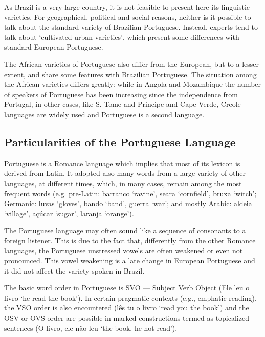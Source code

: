 \begin{multicols}{2}
As Brazil is a very large country, it is not feasible to present here its linguistic varieties. For geographical, political and social reasons, neither is it possible to talk about the standard variety of Brazilian Portuguese. Instead, experts tend to talk about ‘cultivated urban varieties’, which present some differences with standard European Portuguese. 

The African varieties of Portuguese also differ from the European, but to a lesser extent, and share some features with Brazilian Portuguese. The situation among the African varieties differs greatly: while in Angola and Mozambique the number of speakers of Portuguese has been increasing since the independence from Portugal, in other cases, like S. Tome and Principe and Cape Verde, Creole languages are widely used and Portuguese is a second language.

\subsection{Particularities of the Portuguese Language}

 Portuguese is a Romance language\cite{cardeira} which implies that most of its lexicon is derived from Latin. It adopted also many words from a large variety of other languages, at different times, which, in many cases, remain among the most frequent words (e.g. pre-Latin: barranco ‘ravine’, seara ‘cornfield’, bruxa ‘witch’; Germanic: luvas ‘gloves’, bando ‘band’, guerra ‘war’; and mostly Arabic: aldeia ‘village’, açúcar ‘sugar’, laranja ‘orange’).


The Portuguese language may often sound like a sequence of consonants to a foreign listener. This is due to the fact that, differently from the other Romance languages, the Portuguese unstressed vowels are often weakened or even not pronounced. This vowel weakening is a late change in European Portuguese and it did not affect the variety spoken in Brazil.

The basic word order in Portuguese is SVO — Subject Verb Object (Ele leu o livro ‘he read the book'). In certain pragmatic contexts (e.g., emphatic reading), the VSO order is also encountered (lês tu o livro ‘read you the book’) and the OSV or OVS order are possible in marked constructions termed as topicalized sentences (O livro, ele não leu ‘the book, he not read’).


\end{multicols}
